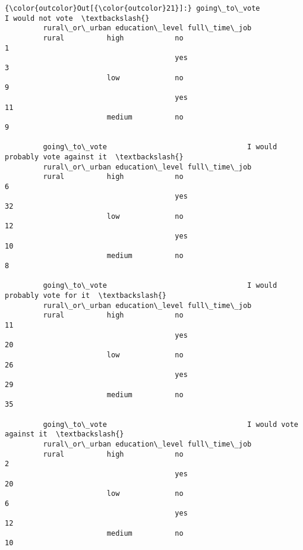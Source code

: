 \documentclass[11pt]{article}
\begin{document}
\begin{Verbatim}[commandchars=\\\{\}]
{\color{outcolor}Out[{\color{outcolor}21}]:} going\_to\_vote                                 I would not vote  \textbackslash{}
         rural\_or\_urban education\_level full\_time\_job                     
         rural          high            no                            1   
                                        yes                           3   
                        low             no                            9   
                                        yes                          11   
                        medium          no                            9   
         
         going\_to\_vote                                 I would probably vote against it  \textbackslash{}
         rural\_or\_urban education\_level full\_time\_job                                     
         rural          high            no                                            6   
                                        yes                                          32   
                        low             no                                           12   
                                        yes                                          10   
                        medium          no                                            8   
         
         going\_to\_vote                                 I would probably vote for it  \textbackslash{}
         rural\_or\_urban education\_level full\_time\_job                                 
         rural          high            no                                       11   
                                        yes                                      20   
                        low             no                                       26   
                                        yes                                      29   
                        medium          no                                       35   
         
         going\_to\_vote                                 I would vote against it  \textbackslash{}
         rural\_or\_urban education\_level full\_time\_job                            
         rural          high            no                                   2   
                                        yes                                 20   
                        low             no                                   6   
                                        yes                                 12   
                        medium          no                                  10   
         

\end{Verbatim}
\end{document}
